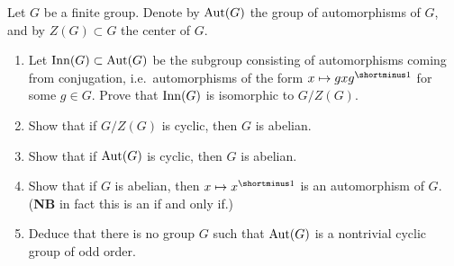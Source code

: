 \begin{question}[subtitle = {January 2018 Problem 4, modified},ID=Jan18_4]
Let $G$ be a finite group. Denote by $\operatorname{Aut}(G)$ the group of automorphisms of $G$, and by $Z(G) \subset G$ the center of $G$.
\begin{enumerate}
    \item Let $\operatorname{Inn}(G) \subset \operatorname{Aut}(G)$ be the subgroup consisting of automorphisms coming from conjugation, i.e.\ automorphisms of the form $x \mapsto gxg\inv$ for some $g \in G$. Prove that $\operatorname{Inn}(G)$ is isomorphic to $G/Z(G)$.
    \item Show that if $G/Z(G)$ is cyclic, then $G$ is abelian.
    \item Show that if $\operatorname{Aut}(G)$ is cyclic, then $G$ is abelian.
    \item Show that if $G$ is abelian, then $x \mapsto x\inv$ is an automorphism of $G$. (\textbf{NB} in fact this is an if and only if.)
    \item Deduce that there is no group $G$ such that $\operatorname{Aut}(G)$ is a nontrivial cyclic group of odd order.
\end{enumerate}
\end{question}

